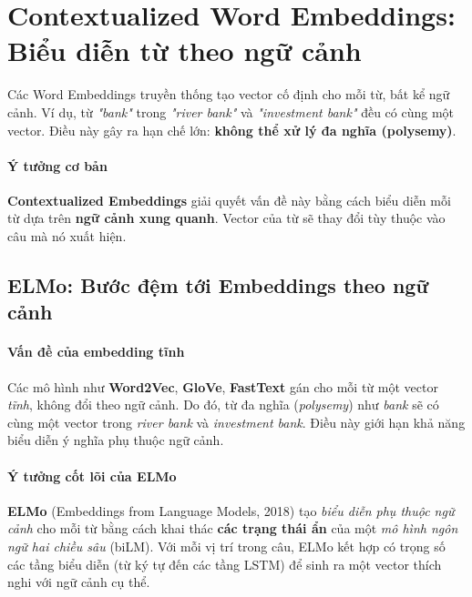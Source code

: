
\section{Contextualized Word Embeddings: Biểu diễn từ theo ngữ cảnh}
\label{sec:contextualized_embeddings}

Các Word Embeddings truyền thống tạo vector cố định cho mỗi từ, bất kể ngữ cảnh. Ví dụ, từ \textit{"bank"} trong \textit{"river bank"} và \textit{"investment bank"} đều có cùng một vector. Điều này gây ra hạn chế lớn: \textbf{không thể xử lý đa nghĩa (polysemy)}.

\paragraph{Ý tưởng cơ bản}\leavevmode

\textbf{Contextualized Embeddings} giải quyết vấn đề này bằng cách biểu diễn mỗi từ dựa trên \textbf{ngữ cảnh xung quanh}. Vector của từ sẽ thay đổi tùy thuộc vào câu mà nó xuất hiện.

\subsection{ELMo: Bước đệm tới Embeddings theo ngữ cảnh}
\label{ssec:elmo}

\paragraph{Vấn đề của embedding tĩnh}
Các mô hình như \textbf{Word2Vec}, \textbf{GloVe}, \textbf{FastText} gán cho mỗi từ một vector \emph{tĩnh}, không đổi theo ngữ cảnh. Do đó, từ đa nghĩa (\emph{polysemy}) như \textit{bank} sẽ có cùng một vector trong \emph{river bank} và \emph{investment bank}. Điều này giới hạn khả năng biểu diễn ý nghĩa phụ thuộc ngữ cảnh.

\paragraph{Ý tưởng cốt lõi của ELMo}
\textbf{ELMo} (Embeddings from Language Models, 2018) \cite{peters2018deep} tạo \emph{biểu diễn phụ thuộc ngữ cảnh} cho mỗi từ bằng cách khai thác \textbf{các trạng thái ẩn} của một \emph{mô hình ngôn ngữ hai chiều sâu} (biLM). Với mỗi vị trí trong câu, ELMo kết hợp có trọng số các tầng biểu diễn (từ ký tự đến các tầng LSTM) để sinh ra một vector thích nghi với ngữ cảnh cụ thể.

